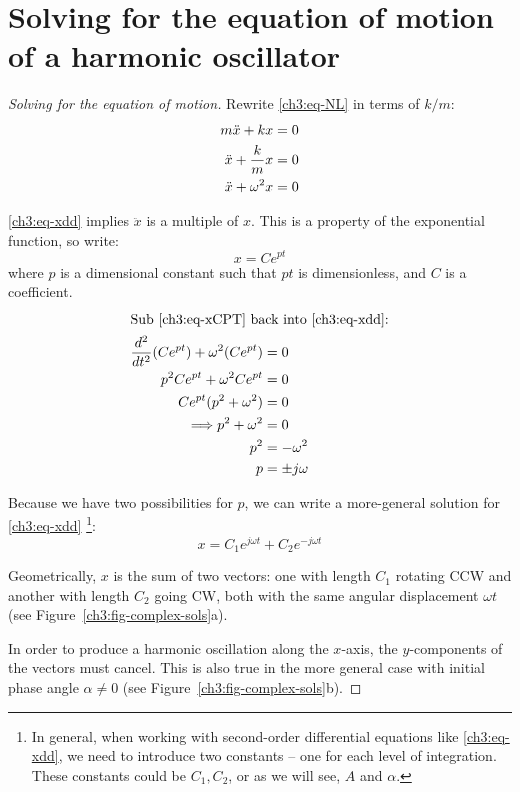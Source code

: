 \section{Solving for the equation of motion of a harmonic oscillator}

\begin{proof}[Solving for the equation of motion]
Rewrite \eqref{ch3:eq-NL} in terms of $k/m$:
\begin{align}
m\ddot{x} + kx &= 0 \notag\\
\ddot{x} + \frac{k}{m}x &= 0 \notag\\
\ddot{x} + \omega^2 x  &= 0 \label{ch3:eq-xdd}
\end{align}

\eqref{ch3:eq-xdd} implies $\ddot{x}$ is a multiple of $x$. This is a property of the exponential function, so write: 
\begin{equation}
	x=Ce^{pt} \label{ch3:eq-xCPT}
\end{equation}
where $p$ is a dimensional constant such that $pt$ is dimensionless, and $C$ is a coefficient.
%
\begin{align*}
\intertext{Sub \eqref{ch3:eq-xCPT} back into \eqref{ch3:eq-xdd}:}
\frac{d^2}{dt^2}(Ce^{pt})+\omega^2(Ce^{pt}) &= 0\\
p^2Ce^{pt}+\omega^2Ce^{pt}&=0 \\
Ce^{pt}(p^2+\omega^2) &=0 \\
\Longrightarrow p^2 + \omega^2 &= 0 \\
p^2 &= -\omega^2 \\
p &= \pm j\omega
\end{align*}

Because we have two possibilities for $p$, we can write a more-general solution for \eqref{ch3:eq-xdd}%
\footnote{In general, when working with second-order differential equations like \eqref{ch3:eq-xdd}, we need to introduce two constants -- one for each level of integration. These constants could be $C_1, C_2$, or as we will see, $A$ and $\alpha$.}:
\begin{equation}
	 x = C_1e^{j\omega t}+C_2e^{-j\omega t}	\label{ch3:eq-complex-general-sol}
\end{equation}

Geometrically, $x$ is the sum of two vectors: one with length $C_1$ rotating CCW and another with length $C_2$ going CW, both with the same angular displacement $\omega t$ (see Figure~\ref{ch3:fig-complex-sols}a).

In order to produce a harmonic oscillation along the $x$-axis, the $y$-components of the vectors must cancel. This is also true in the more general case with initial phase angle $\alpha\neq 0$ (see Figure~\ref{ch3:fig-complex-sols}b).


\end{proof}
